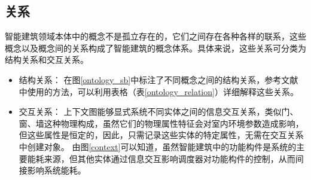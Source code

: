 \subsection{关系}
	智能建筑领域本体中的概念不是孤立存在的，它们之间存在各种各样的联系，这些概念以及概念间的关系构成了智能建筑的概念体系。具体来说，这些关系可分类为结构关系和交互关系。
	\begin{itemize}
	\item 结构关系：
	在图\ref{ontology_sb}中标注了不同概念之间的结构关系，参考文献\citep{陈小红2011基于问题框架的需求建模}中使用的方法，可以利用表格（表\ref{ontology_relation}）详细解释这些关系。
	\item 交互关系：
	上下文图能够显式系统不同实体之间的信息交互关系，类似门、窗、墙这种物理构成，虽然它们的物理属性特征会对室内环境参数造成影响，但这些属性是恒定的，因此，只需记录这些实体的特定属性，无需在交互关系中创建对象。
	由图\ref{context}可以知道，虽然智能建筑中的功能构件是系统的主要能耗来源，但其他实体通过信息交互影响调度器对功能构件的控制，从而间接影响系统能耗。
	\end{itemize}
	
